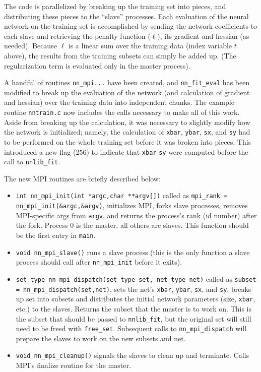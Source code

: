 \documentclass{article}    %
\begin{document}
The code is parallelized by breaking up the training set into pieces,
and distributing these pieces to the ``slave'' processes. Each
evaluation of the neural network on the training set is accomplished
by sending the network coefficients to each slave and retrieving the
penalty function ($\ell$), its gradient and hessian (as needed).
Because $\ell$ is a linear sum over the training data (index variable
$t$ above), the results from the training subsets can simply be added
up. (The regularization term is evaluated only in the master process).

A handful of routines \verb|nn_mpi...| have been created, and
\verb|nn_fit_eval| has been modified to break up the evaluation of the
network (and calculation of gradient and hessian) over the training
data into independent chunks. The example routine \verb|nntrain.c| now
includes the calls necessary to make all of this work. Aside from
breaking up the calculation, it was necessary to slightly modify how
the network is initialized; namely, the calculation of \verb|xbar|,
\verb|ybar|, \verb|sx|, and \verb|sy| had to be performed on the whole
training set before it was broken into pieces. This introduced a new
flag (256) to indicate that \verb|xbar|-\verb|sy| were computed before
the call to \verb|nnlib_fit|.

The new MPI routines are briefly described below:
\begin{itemize}
\item \verb|int nn_mpi_init(int *argc,char **argv[])| called as
  \verb|mpi_rank = nn_mpi_init(&argc,&argv)|, initializes MPI, forks
  slave processes, removes MPI-specific args from \verb|argv|, and
  returns the process's rank (id number) after the fork. Process 0 is
  the master, all others are slaves. This function should be the first
  entry in \verb|main|.
\item \verb|void nn_mpi_slave()| runs a slave process (this is the
  only function a slave process should call after \verb|nn_mpi_init|
  before it exits).
\item \verb|set_type nn_mpi_dispatch(set_type set, net_type net)|
  called as \verb|subset = nn_mpi_dispatch(set,net)|, sets the net's
  \verb|xbar|, \verb|ybar|, \verb|sx|, and \verb|sy|, breaks up set
  into subsets and distributes the initial network parameters (size,
  \verb|xbar|, etc.) to the slaves. Returns the subset that the master
  is to work on. This is the subset that should be passed to
  \verb|nnlib_fit|, but the original set will still need to be freed
  with \verb|free_set|. Subsequent calls to \verb|nn_mpi_dispatch|
  will prepare the slaves to work on the new subsets and net.
\item \verb|void nn_mpi_cleanup()| signals the slaves to clean up and terminate.
  Calls MPI's finalize routine for the master.
\end{itemize}
\end{document}

